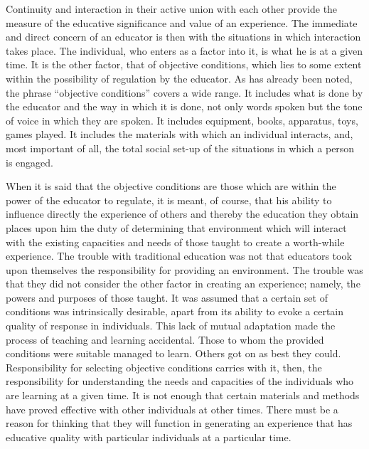 Continuity and interaction in their active union with each other provide the measure of 
the educative significance and value of an experience. The immediate and direct concern 
of an educator is then with the situations in which interaction takes place. The individual, 
who enters as a factor into it, is what he is at a given time. It is the other factor, that of 
objective conditions, which lies to some extent within the possibility of regulation by the 
educator. As has already been noted, the phrase \enquote{objective conditions} covers a wide 
range. It includes what is done by the educator and the way in which it is done, not only 
words spoken but the tone of voice in which they are spoken. It includes equipment, 
books, apparatus, toys, games played. It includes the materials with which an individual 
interacts, and, most important of all, the total social set-up of the situations in which a 
person is engaged. 

When it is said that the objective conditions are those which are within the power of 
the educator to regulate, it is meant, of course, that his ability to influence directly the 
experience of others and thereby the education they obtain places upon him the duty of 
determining that environment which will interact with the existing capacities and needs 
of those taught to create a worth-while experience. The trouble with traditional education 
was not that educators took upon themselves the responsibility for providing an 
environment. The trouble was that they did not consider the other factor in creating an 
experience; namely, the powers and purposes of those taught. It was assumed that a 
certain set of conditions was intrinsically desirable, apart from its ability to evoke a 
certain quality of response in individuals. This lack of mutual adaptation made the 
process of teaching and learning accidental. Those to whom the provided conditions were 
suitable managed to learn. Others got on as best they could. Responsibility for selecting 
objective conditions carries with it, then, the responsibility for understanding the needs 
and capacities of the individuals who are learning at a given time. It is not enough that 
certain materials and methods have proved effective with other individuals at other times. 
There must be a reason for thinking that they will function in generating an experience 
that has educative quality with particular individuals at a particular time. 

